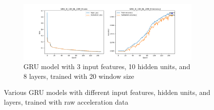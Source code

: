 \documentclass{article}
\begin{document}
\begin{figure}[ht]
\begin{subfigure}
            \label{fig:GRU_3I_10H_4L_20W_R_GRAPH}
        \end{subfigure}
        \begin{subfigure}
            {\textwidth}
            \centering
            \includegraphics[width=\textwidth]{GRU_3I_10H_8L_20W_R_GRAPH.png}
            \caption{GRU model with 3 input features, 10 hidden units, and 8
            layers, trained with 20 window size}
            \label{fig:GRU_3I_10H_8L_20W_R_GRAPH}
        \end{subfigure}
        \caption{Various GRU models with different input features, hidden units,
        and layers, trained with raw acceleration data}
        \label{fig:GRU_3I_10H_R}
    \end{figure}
\end{document}

